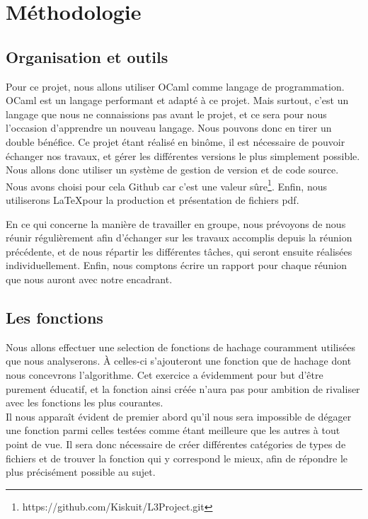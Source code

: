 \documentclass[final,twoside,article,10pt]{scrartcl}
\begin{document}
	
\section{Méthodologie}
	\subsection{Organisation et outils}
		Pour ce projet, nous allons utiliser OCaml comme langage de programmation. OCaml est un langage performant et 	adapté à ce projet. Mais surtout, c'est un langage que nous ne connaissions pas avant le projet, et ce sera pour nous l'occasion d'apprendre un nouveau langage. Nous pouvons donc en tirer un double bénéfice.
	Ce projet étant réalisé en binôme, il est nécessaire de pouvoir échanger nos travaux, et gérer les différentes versions le plus simplement possible. Nous allons donc utiliser un système de gestion de version et de code source. Nous avons choisi pour cela Github car c'est une valeur sûre\footnote{https://github.com/Kiskuit/L3Project.git}. Enfin, nous utiliserons \LaTeX pour la production et présentation de fichiers pdf.\\
	\par En ce qui concerne la manière de travailler en groupe, nous prévoyons de nous réunir régulièrement afin d'échanger sur les travaux accomplis depuis la réunion précédente, et de nous répartir les différentes tâches, qui seront ensuite réalisées individuellement. Enfin, nous comptons écrire un rapport pour chaque réunion que nous auront avec notre encadrant.
		
	\subsection{Les fonctions}
            Nous allons effectuer une selection de fonctions de hachage couramment utilisées que nous analyserons. \`A celles-ci s'ajouteront une fonction que de hachage dont nous concevrons l'algorithme. Cet exercice a évidemment pour but d'être purement éducatif, et la fonction ainsi créée n'aura pas pour ambition de rivaliser avec les fonctions les plus courantes.\\
		Il nous apparaît évident de premier abord qu'il nous sera impossible de dégager une fonction parmi celles testées comme étant meilleure que les autres à tout point de vue. Il sera donc nécessaire de créer différentes catégories de types de fichiers et de trouver la fonction qui y correspond le mieux, afin de répondre le plus précisément possible au sujet.
		
\end{document}
